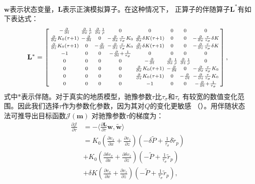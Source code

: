 $\mathbf{w}$表示状态变量，$\mathbf{L}$表示正演模拟算子。在这种情况下，
正算子的伴随算子$\mathbf{L}^\ast$有如下表达式：
    \begin{eqnarray}
        \mathbf{L}^\ast =  
        \begin{bmatrix}
            \begin{smallmatrix}
            -\frac{\partial}{\partial t} &\frac{\partial}{\partial x}\frac{1}{\rho}
            &\frac{\partial}{\partial z}\frac{1}{\rho} &0 &0 &0 &0 &0\cr
            \frac{\partial}{\partial x}K_0(\tau +1) &-\frac{\partial}{\partial t} &0 
            &-\frac{\partial}{\partial x}\frac{\tau}{\tau_\sigma}K_0
            &\frac{\partial}{\partial x}\delta K(\tau+1) &0 &0
            &-\frac{\partial}{\partial x}\frac{\tau}{\tau_\sigma}\delta K \cr
            \frac{\partial}{\partial z}K_0(\tau +1) &0 &-\frac{\partial}{\partial t} 
            &-\frac{\partial}{\partial z}\frac{\tau}{\tau_\sigma}K_0
            &\frac{\partial}{\partial z}\delta K(\tau+1) &0 &0
            &-\frac{\partial}{\partial z}\frac{\tau}{\tau_\sigma}\delta K \cr
            -1 &0 &0 &-\frac{\partial}{\partial t}+\frac{1}{\tau_\sigma} &0 &0 &0 &0\cr
            0 &0 &0 &0 &-\frac{\partial}{\partial t} &\frac{\partial}{\partial
            x}\frac{1}{\rho} &\frac{\partial}{\partial z}\frac{1}{\rho} &0\cr
            0 &0 &0 &0 &\frac{\partial}{\partial x}K_0(\tau +1)
            &-\frac{\partial}{\partial t} &0 &-\frac{\partial}{\partial
            x}\frac{\tau}{\tau_\sigma}K_0 \cr
            0 &0 &0 &0 &\frac{\partial}{\partial z}K_0(\tau +1) &0
            &-\frac{\partial}{\partial t} &-\frac{\partial}{\partial
        z}\frac{\tau}{\tau_\sigma}K_0 \cr
           0 &0 &0 &0 &-1 &0 &0 &-\frac{\partial}{\partial t}+\frac{1}{\tau_\sigma}
            \end{smallmatrix}
        \end{bmatrix},
		\label{eq:ad_operator}
    \end{eqnarray}
式中$\ast$表示伴随。对于真实的地质模型，驰豫参数$\tau$比$\tau_\sigma$和$\tau_\epsilon$
有较宽的数值变化范围。因此我们选择$\tau$作为参数化参数，因为其对$Q$的变化更敏感
（）。用伴随状态法可推导出目标函数$\mathcal{J}(\mathbf{m})$
对驰豫参数$\tau$的梯度为：
   \begin{equation}
    \begin{aligned}
        \frac{\partial \mathcal{J}}{\partial \tau} &= -\langle\frac{\partial \mathbf{L}}{\partial\tau}
        \mathbf{w},\tilde{\mathbf{w}} \rangle \\
        &= {K_0(\frac{\partial v_x}{\partial
        x}+\frac{\partial v_z}{\partial
    z})(-\delta\tilde{P}+\frac{1}{\tau_\sigma}\delta\tilde{r}_p)} \\
    &{+K_0(\frac{\partial \delta v_x}{\partial x}+\frac{\partial \delta
        v_z}{\partial z})(-\tilde{P}+\frac{1}{\tau_\sigma}\tilde{r}_p)} \\
        &{+\delta K(\frac{\partial v_x}{\partial x}+\frac{\partial v_z}{\partial
        z})(-\tilde{P}+\frac{1}{\tau_\sigma}\tilde{r}_p)},
    \end{aligned}
    \label{eq:gradient}
    \end{equation}
